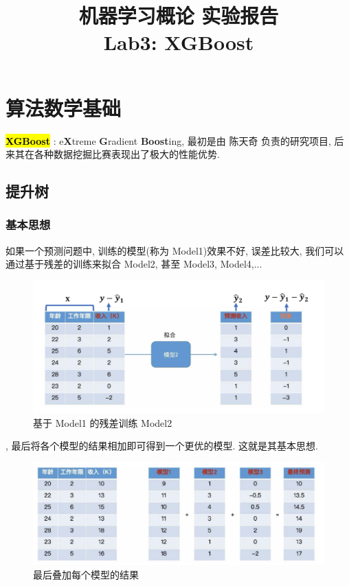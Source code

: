 \documentclass[UTF8]{article}
\title{机器学习概论 实验报告 \\ \Large Lab3: XGBoost}
\newcommand{\hlg}[1]{
	\begingroup
		\sethlcolor{lgray}%
		\textcolor{black}{\hl{\mbox{#1}}}%
	\endgroup
}
\begin{document}
\maketitle
\tableofcontents
\newpage
\section{算法数学基础}
\noindent \hlg{\textbf{XGBoost}}: e\textbf{X}treme \textbf{G}radient \textbf{Boost}ing, 最初是由 陈天奇 负责的研究项目, 后来其在各种数据挖掘比赛表现出了极大的性能优势.
\subsection{提升树}
\subsubsection{基本思想}
\noindent 如果一个预测问题中, 训练的模型(称为 Model1)效果不好, 误差比较大, 我们可以通过基于残差的训练来拟合 Model2, 甚至 Model3, Model4,...
\begin{figure}[H]
	\centering
	\includegraphics[width=\linewidth*5/8]{model2.png}
	\caption{基于 Model1 的残差训练 Model2}
\end{figure}\par
{}, 最后将各个模型的结果相加即可得到一个更优的模型. 这就是其基本思想.
\begin{figure}[H]
	\centering
	\includegraphics[width=\linewidth*5/8]{model1234.png}
	\caption{最后叠加每个模型的结果}
\end{figure}\par
\end{document}
